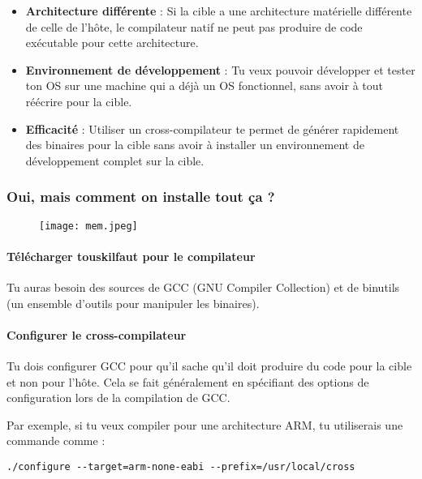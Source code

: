 \documentclass{article}
\begin{document}
\begin{itemize}
    \item \textbf{Architecture différente} : Si la cible a une architecture matérielle différente de celle de l'hôte, le compilateur natif ne peut pas produire de code exécutable pour cette architecture.
    
    \item \textbf{Environnement de développement} : Tu veux pouvoir développer et tester ton OS sur une machine qui a déjà un OS fonctionnel, sans avoir à tout réécrire pour la cible.
    
    \item \textbf{Efficacité} : Utiliser un cross-compilateur te permet de générer rapidement des binaires pour la cible sans avoir à installer un environnement de développement complet sur la cible.
\end{itemize}

\subsubsection*{Oui, mais comment on installe tout ça ?}

\begin{figure}[h!]
    \centering
    \texttt{[image: mem.jpeg]}
    \label{fig:logo1}
\end{figure}

\paragraph{Télécharger touskilfaut pour le compilateur}
Tu auras besoin des sources de GCC (GNU Compiler Collection) et de binutils (un ensemble d'outils pour manipuler les binaires).

\paragraph{Configurer le cross-compilateur}
Tu dois configurer GCC pour qu'il sache qu'il doit produire du code pour la cible et non pour l'hôte. Cela se fait généralement en spécifiant des options de configuration lors de la compilation de GCC.

Par exemple, si tu veux compiler pour une architecture ARM, tu utiliserais une commande comme :

\begin{lstlisting}
./configure --target=arm-none-eabi --prefix=/usr/local/cross
\end{lstlisting}
\end{document}
